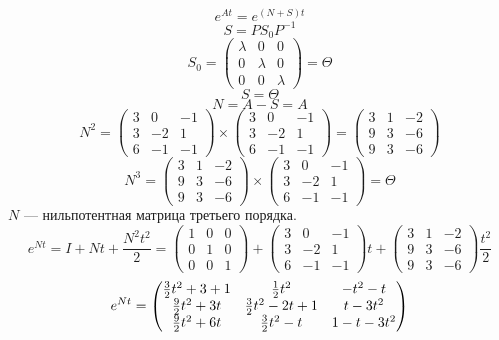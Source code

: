 \documentclass[a4paper,10pt,notitlepage,pdftex,headsepline]{scrartcl}
\begin{document}
\[e^{A t} = e^{(N + S) t}\]
\[S = P S_0 P^{-1}\]
\[S_0 = \left(\begin{matrix}
\lambda & 0 & 0\\
0 & \lambda & 0\\
0 & 0 & \lambda
\end{matrix}\right) = \Theta\]
\[S = \Theta\]
\[N = A - S = A\]
\[N^2 = \left(\begin{matrix}
3 & 0 & -1\\
3 & -2& 1\\
6 & -1& -1
\end{matrix}\right)\times\left(\begin{matrix}
3 & 0 & -1\\
3 & -2& 1\\
6 & -1& -1
\end{matrix}\right)=\left(\begin{matrix}
3 & 1 & -2\\
9 & 3 & -6\\
9 & 3 & -6
\end{matrix}\right)\]
\[N^3=\left(\begin{matrix}
3 & 1 & -2\\
9 & 3 & -6\\
9 & 3 & -6
\end{matrix}\right)\times\left(\begin{matrix}
3 & 0 & -1\\
3 & -2& 1\\
6 & -1& -1
\end{matrix}\right) = \Theta\]
$N$ --- нильпотентная матрица третьего порядка.
\[e^{N t} = I + Nt + \frac{N^2 t^2}{2} =\left(\begin{matrix}
1 & 0 & 0\\
0 & 1 & 0\\
0 & 0 & 1
\end{matrix}\right) + \left(\begin{matrix}
3 & 0 & -1\\
3 & -2& 1\\
6 & -1& -1
\end{matrix}\right) t + \left(\begin{matrix}
3 & 1 & -2\\
9 & 3 & -6\\
9 & 3 & -6
\end{matrix}\right) \frac{t^2}{2}\]
\[\displaystyle e^{N t} = \left(\begin{matrix}
\strut\frac{3}{2} t^2 + 3 + 1 & \frac{1}{2} t^2           & -t^2 - t\\
\frac{9}{2} t^2 + 3 t   & \frac{3}{2} t^2 - 2 t + 1 & t - 3 t^2\\
\frac{9}{2} t^2 + 6 t   & \frac{3}{2} t^2 - t       & 1 - t - 3 t^2
\end{matrix}\right)\]
\end{document}
